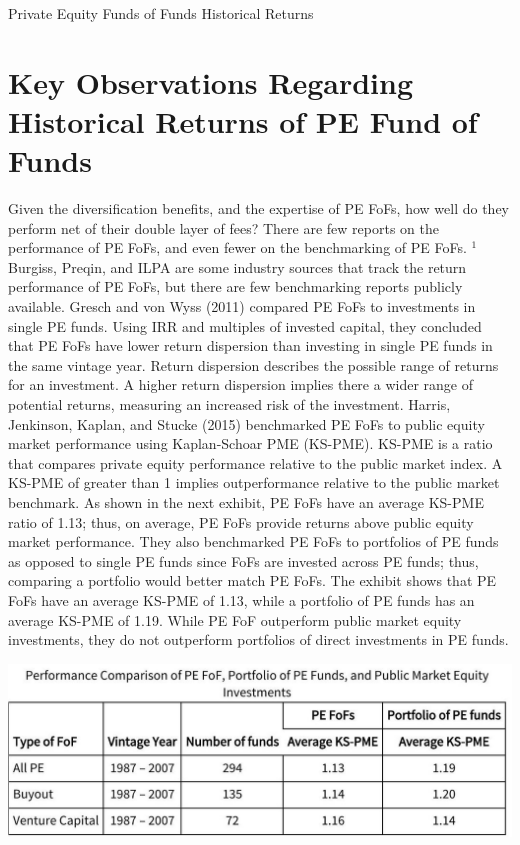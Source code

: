 \documentclass[11pt]{article}
\begin{document}
Private Equity Funds of Funds Historical Returns

\section*{Key Observations Regarding Historical Returns of PE Fund of Funds}
Given the diversification benefits, and the expertise of PE FoFs, how well do they perform net of their double layer of fees? There are few reports on the performance of PE FoFs, and even fewer on the benchmarking of PE FoFs. ${ }^{1}$ Burgiss, Preqin, and ILPA are some industry sources that track the return performance of PE FoFs, but there are few benchmarking reports publicly available. Gresch and von Wyss (2011) compared PE FoFs to investments in single PE funds. Using IRR and multiples of invested capital, they concluded that PE FoFs have lower return dispersion than investing in single PE funds in the same vintage year. Return dispersion describes the possible range of returns for an investment. A higher return dispersion implies there a wider range of potential returns, measuring an increased risk of the investment. Harris, Jenkinson, Kaplan, and Stucke (2015) benchmarked PE FoFs to public equity market performance using Kaplan-Schoar PME (KS-PME). KS-PME is a ratio that compares private equity performance relative to the public market index. A KS-PME of greater than 1 implies outperformance relative to the public market benchmark. As shown in the next exhibit, PE FoFs have an average KS-PME ratio of 1.13; thus, on average, PE FoFs provide returns above public equity market performance. They also benchmarked PE FoFs to portfolios of PE funds as opposed to single PE funds since FoFs are invested across PE funds; thus, comparing a portfolio would better match PE FoFs. The exhibit shows that PE FoFs have an average KS-PME of 1.13, while a portfolio of PE funds has an average KS-PME of 1.19. While PE FoF outperform public market equity investments, they do not outperform portfolios of direct investments in PE funds.

\begin{center}
\includegraphics[max width=\textwidth]{2024_04_10_9f7c3d00b4613a650b6cg-2}
\end{center}
\end{document}
